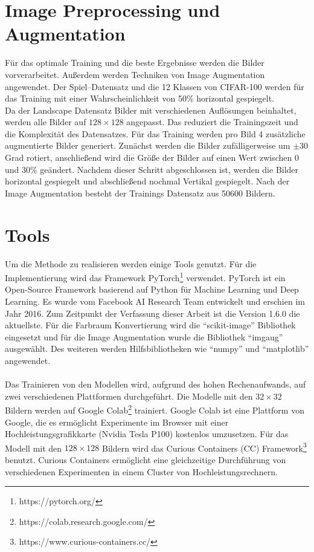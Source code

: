 \section{Image Preprocessing und Augmentation}
Für das optimale Training und die beste Ergebnisse werden die Bilder vorverarbeitet. Außerdem werden Techniken von Image Augmentation angewendet.
Der Spiel–Datensatz und die 12 Klassen von CIFAR-100 werden für das Training mit einer Wahrscheinlichkeit von 50\% horizontal gespiegelt.
\\
Da der Landscape Datensatz Bilder mit verschiedenen Auflösungen beinhaltet, werden alle Bilder auf $ 128 \times 128 $ angepasst. Das 
reduziert die Trainingszeit und die Komplexität des Datensatzes. 
Für das Training werden pro Bild 4 zusätzliche augmentierte Bilder generiert. Zunächst werden die Bilder zufälligerweise um $\pm 30$ Grad rotiert,
anschließend wird die Größe der Bilder auf einen Wert zwischen 0 und 30\% geändert.
Nachdem dieser Schritt abgeschlossen ist, werden die Bilder horizontal gespiegelt und abschließend nochmal Vertikal gespiegelt. 
Nach der Image Augmentation besteht der Trainings Datensatz aus 50600 Bildern.

\section{Tools}
Um die Methode zu realisieren werden einige Tools genutzt. Für die Implementierung wird das Framework 
PyTorch\footnote{https://pytorch.org/}\label{tool:pytorch} verwendet. PyTorch ist ein Open-Source Framework basierend auf Python für Machine Learning und 
Deep Learning. Es wurde vom Facebook AI Research Team entwickelt und erschien im Jahr 2016. Zum Zeitpunkt der Verfassung dieser Arbeit ist 
die Version 1.6.0 die aktuellste. Für die Farbraum Konvertierung wird die ``scikit-image'' Bibliothek eingesetzt und für die Image Augmentation 
wurde die Bibliothek ``imgaug'' ausgewählt. Des weiteren werden Hilfsbibliotheken wie ``numpy'' und ``matplotlib'' angewendet.
\\
\\
Das Trainieren von den Modellen wird, aufgrund des hohen Rechenaufwands, auf zwei verschiedenen Plattformen durchgeführt. Die Modelle mit den
$32 \times 32$ Bildern werden auf Google Colab\footnote{https://colab.research.google.com/} trainiert. Google Colab ist eine Plattform von 
Google, die es ermöglicht Experimente im Browser mit einer Hochleistungsgrafikkarte (Nvidia Tesla P100) kostenlos umzusetzen. Für das Modell mit den 
$128 \times 128$ Bildern
wird das Curious Containers (CC) Framework\footnote{https://www.curious-containers.cc/} benutzt. Curious Containers ermöglicht eine 
gleichzeitige Durchführung von verschiedenen Experimenten in einem Cluster von Hochleistungsrechnern.


